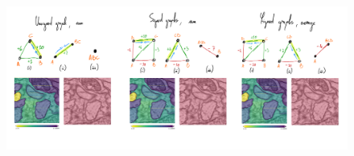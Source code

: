 \begin{figure}[t]
\centering
\includegraphics[width=\textwidth,trim=0.4in 1.3in 0.in 0.2in,clip]{./figs/intro_image.jpg} %
\caption{
\label{fig:intro_figure}}
\end{figure}
